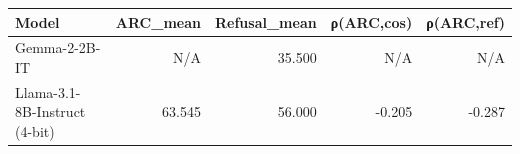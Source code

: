 \begin{tabular}{lrrrr}
\toprule
Model & ARC_mean & Refusal_mean & ρ(ARC,cos) & ρ(ARC,ref) \\
\midrule
Gemma-2-2B-IT & N/A & 35.500 & N/A & N/A \\
Llama-3.1-8B-Instruct (4-bit) & 63.545 & 56.000 & -0.205 & -0.287 \\
\bottomrule
\end{tabular}
